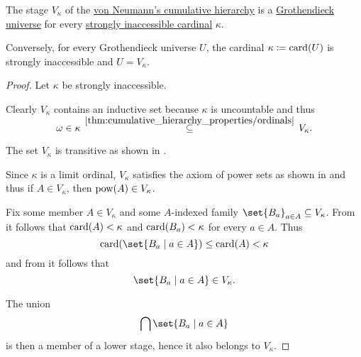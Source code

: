 \begin{theorem}\label{thm:grothendieck_universe_iff_strongly_inaccessible}
  The stage \( V_\kappa \) of the \hyperref[def:cumulative_hierarchy]{von Neumann's cumulative hierarchy} is a \hyperref[def:grothendieck_universe]{Grothendieck universe} for every \hyperref[def:regular_cardinal]{strongly inaccessible cardinal} \( \kappa \).

  Conversely, for every Grothendieck universe \( U \), the cardinal \( \kappa \coloneqq \operatorname{card}(U) \) is strongly inaccessible and \( U = V_\kappa \).
\end{theorem}
\begin{proof}
  \SufficiencySubProof Let \( \kappa \) be strongly inaccessible.

   Clearly \( V_\kappa \) contains an inductive set because \( \kappa \) is uncountable and thus
  \begin{equation*}
    \omega
    \in
    \kappa
    \reloset {\ref{thm:cumulative_hierarchy_properties/ordinals}} \subseteq
    V_\kappa.
  \end{equation*}

   The set \( V_\kappa \) is transitive as shown in .

   Since \( \kappa \) is a limit ordinal, \( V_\kappa \) satisfies the axiom of power sets as shown in  and thus if \( A \in V_\kappa \), then \( \operatorname{pow}(A) \in V_\kappa \).

   Fix some member \( A \in V_\kappa \) and some \( A \)-indexed family \( \set{ B_a }_{a \in A} \subseteq V_\kappa \). From  it follows that \( \operatorname{card}(A) < \kappa \) and \( \operatorname{card}(B_a) < \kappa \) for every \( a \in A \). Thus
  \begin{equation*}
    \card(\set{ B_a \given a \in A }) \leq \card(A) < \kappa
  \end{equation*}
  and from  it follows that
  \begin{equation*}
    \set{ B_a \given a \in A } \in V_\kappa.
  \end{equation*}

  The union
  \begin{equation*}
    \bigcap \set{ B_a \given a \in A }
  \end{equation*}
  is then a member of a lower stage, hence it also belongs to \( V_\kappa \).


\end{proof}
